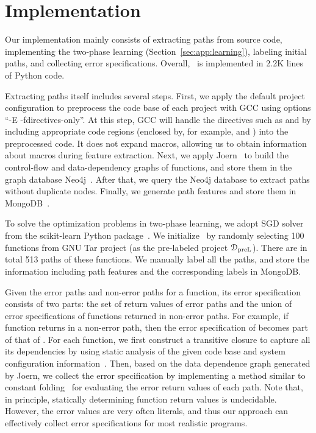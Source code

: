 \documentclass[12pt]{report}	%
\begin{document}
\section{Implementation}
\label{sec:app:impl}

Our implementation mainly consists of extracting paths from source code, 
implementing the two-phase learning (Section~\ref{sec:app:learning}),
labeling initial paths, and collecting error specifications. 
%
Overall, \newTool\ is implemented in 2.2K lines of Python code.

Extracting paths itself includes several steps. First, 
we apply the default project configuration to preprocess the code base 
of each project with GCC using options ``-E -fdirectives-only''.
At this step, GCC will handle the directives such as 
and  
by including appropriate code regions (enclosed by, for example, 
 and ) into the preprocessed code. 
It does not expand macros, allowing us to obtain
information about macros during feature extraction. 
%
%
Next, we apply Joern~\cite{yamaguchi2014modeling} 
to build the control-flow and data-dependency graphs of functions, 
and store them in the graph database Neo4j~\cite{neo4j}. 
%
After that, we query the Neo4j database to extract 
paths without duplicate nodes. 
%
Finally, we generate path features and store them 
in MongoDB~\cite{mongoDB}.

%
To solve the optimization problems in two-phase learning,
we adopt SGD solver from the scikit-learn Python package~\cite{scikit-learn}.
%
We initialize \newTool\ by
randomly selecting 100 functions from GNU Tar project (as
the pre-labeled project $\mathcal{D}_\text{preL}$).
There are in total 513 paths of these functions.
We manually label all the paths,
and store the information including 
path features and the corresponding labels in MongoDB.


Given the error paths and non-error paths for a function, its
error specification consists of two parts: the set of return values of error paths 
and the union of error specifications
of functions returned in non-error paths. 
For example, if function  returns  in a 
non-error path, then the error specification of  becomes 
part of that of . 
%
For each function, we first construct a transitive closure to capture all
its dependencies by
using static analysis of the given code base and system configuration information~\cite{arnold1996software}.
Then, based on the data dependence graph generated by Joern, 
we collect the error specification by implementing a method similar to constant folding~\cite{muchnick1997advanced} 
for evaluating the error return values of each path.
%
Note that, in principle, statically determining function return values
is undecidable.
However, the error values are very often literals,
and thus our approach can effectively collect error specifications for most realistic programs.
\end{document}
